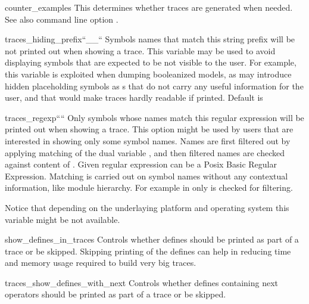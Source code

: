 \begin{nusmvVar} {counter\_examples}{}{}
This determines whether traces are generated when needed. See also
command line option .
\end{nusmvVar}

\begin{nusmvVar} {traces\_hiding\_prefix}{}{``\_\_``}
Symbols names that match this string prefix will be not printed
out when showing a trace. This variable may be used to avoid
displaying symbols that are expected to be not visible to the
user. For example, this variable is exploited when dumping
booleanized models, as \nusmv may introduce hidden placeholding
symbols as s that do not carry any useful information
for the user, and that would make traces hardly readable if
printed. Default is \code{\_\_}
\end{nusmvVar}

\begin{nusmvVar} {traces\_regexp}{}{````}
Only symbols whose names match this regular expression will be
printed out when showing a trace. This option might be used by
users that are interested in showing only some symbol names. Names
are first filtered out by applying matching of the dual
variable , and then
filtered names are checked against content
of . Given regular expression
can be a Posix Basic Regular Expression. Matching is carried out
on symbol names without any contextual information, like module
hierarchy. For example in  only  is
checked for filtering.

Notice that depending on the underlaying platform and operating
system this variable might be not available.
\end{nusmvVar}

\begin{nusmvVar} {show\_defines\_in\_traces}{}{}
Controls whether defines should be printed as part of a trace or be
skipped. Skipping printing of the defines can help in reducing time
and memory usage required to build very big traces.
\end{nusmvVar}

\begin{nusmvVar} {traces\_show\_defines\_with\_next}{}{}
Controls whether defines containing next operators should be printed
as part of a trace or be skipped.
\end{nusmvVar}

